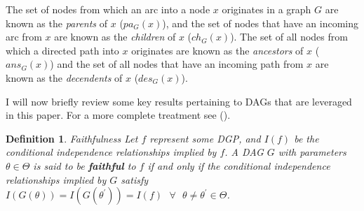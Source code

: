 \documentclass{article}
\newtheorem{definition}{Definition}
\begin{document}
The set of nodes from which an arc into a node $x$ originates in a graph $G$ are known as the \textit{parents} of $x$ ($pa_G(x)$), and the set of nodes that have an incoming arc from $x$ are known as the \textit{children} of $x$ ($ch_G(x)$). The set of all nodes from which a directed path into $x$ originates are known as the \textit{ancestors} of $x$ ($ans_G(x)$) and the set of all nodes that have an incoming path from $x$ are known as the \textit{decendents} of $x$ ($des_G(x)$). 

I will now briefly review some key results pertaining to DAGs that are leveraged in this paper. For a more complete treatment see \citeauthor{pearl2009causality} (\citeyear{pearl2009causality}).

\theoremstyle{definition}
\begin{definition}{Faithfulness}
  Let $f$ represent some DGP, and $I(f)$ be the conditional independence relationships implied by $f$. A DAG $G$ with parameters $\theta \in \Theta$ is said to be \textbf{faithful} to $f$ if and only if the conditional independence relationships implied by $G$ satisfy $I(G(\theta)) = I(G(\theta^\prime)) = I(f) \text{  } \forall \text{  } \theta \not = \theta^\prime \in \Theta$.
  \parencite[p.48]{pearl2009causality}
  \label{faithfulness}
\end{definition}
\end{document}
